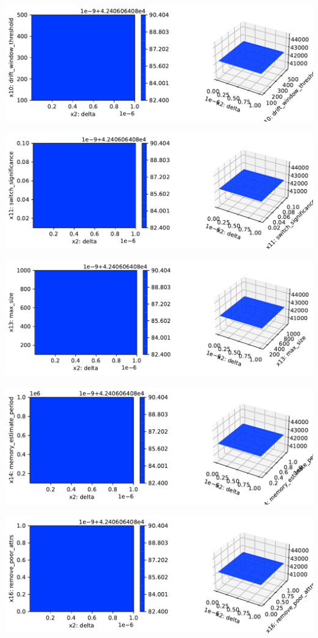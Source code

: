 \documentclass[
  letterpaper,
  DIV=11,
  numbers=noendperiod]{scrreprt}
\begin{document}
\includegraphics{024_spot_hpt_river_friedman_hatr_files/figure-pdf/cell-42-output-35.pdf}

\includegraphics{024_spot_hpt_river_friedman_hatr_files/figure-pdf/cell-42-output-36.pdf}

\includegraphics{024_spot_hpt_river_friedman_hatr_files/figure-pdf/cell-42-output-37.pdf}

\includegraphics{024_spot_hpt_river_friedman_hatr_files/figure-pdf/cell-42-output-38.pdf}

\includegraphics{024_spot_hpt_river_friedman_hatr_files/figure-pdf/cell-42-output-39.pdf}
\end{document}
